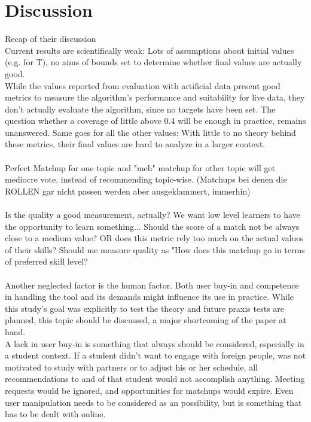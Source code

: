 \documentclass[nochapterpage,bigchapter,linedtoc,longdoc,colorback,accentcolor=tud3b]{tudreport}
\begin{document}
\section{Discussion}
Recap of their discussion\\
Current results are scientifically weak: Lots of assumptions about initial values (e.g. for T), no aims of bounds set to determine whether final values are actually good.\\
While the values reported from evaluation with artificial data present good metrics to measure the algorithm's performance and suitability for live data, they don't actually evaluate the algorithm, since no targets have been set. The question whether a coverage of little above 0.4 will be enough in practice, remains unanswered. Same goes for all the other values: With little to no theory behind these metrics, their final values are hard to analyze in a larger context.\\
\\
Perfect Matchup for one topic and "meh" matchup for other topic will get mediocre vote, instead of recommending topic-wise. (Matchups bei denen die ROLLEN gar nicht passen werden aber ausgeklammert, immerhin)\\
\\
Is the quality a good measurement, actually? We want low level learners to have the opportunity to learn something... Should the score of a match not be always close to a medium value? OR does this metric rely too much on the actual values of their skills? Should me measure quality as "How does this matchup go in terms of preferred skill level?\\
\\
Another neglected factor is the human factor. Both user buy-in and competence in handling the tool and its demands might influence its use in practice. While this study's goal was explicitly to test the theory and future praxis tests are planned, this topic should be discussed, a major shortcoming of the paper at hand.\\
A lack in user buy-in is something that always should be considered, especially in a student context. If a student didn't want to engage with foreign people, was not motivated to study with partners or to adjust his or her schedule, all recommendations to and of that student would not accomplish anything. Meeting requests would be ignored, and opportunities for matchups would expire. Even user manipulation needs to be considered as an possibility, but is something that has to be dealt with online.\\
\end{document}
